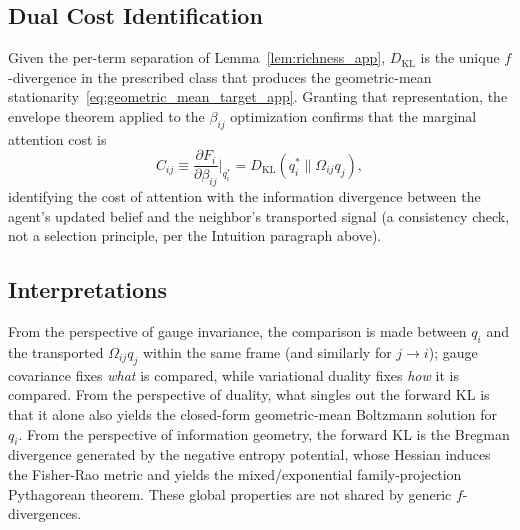 \documentclass[11pt]{article}
\begin{document}
\subsection*{Dual Cost Identification}
Given the per-term separation of Lemma~\ref{lem:richness_app}, $D_{\mathrm{KL}}$ is the unique $f$-divergence in the prescribed class that produces the geometric-mean stationarity~\eqref{eq:geometric_mean_target_app}. Granting that representation, the envelope theorem applied to the $\beta_{ij}$ optimization confirms that the marginal attention cost is
\begin{equation}
C_{ij} \equiv \frac{\partial F_i}{\partial\beta_{ij}}\bigg|_{q_i^*}
= D_{\mathrm{KL}}(q_i^*\|\Omega_{ij}q_j),
\end{equation}
identifying the cost of attention with the information divergence between the agent's updated belief and the neighbor's transported signal (a consistency check, not a selection principle, per the Intuition paragraph above).

\subsection*{Interpretations}
From the perspective of gauge invariance, the comparison is made between $q_i$ and the transported $\Omega_{ij}q_j$ within the same frame (and similarly for $j \rightarrow i$); gauge covariance fixes \emph{what} is compared, while variational duality fixes \emph{how} it is compared. From the perspective of duality, what singles out the forward KL is that it alone also yields the closed-form geometric-mean Boltzmann solution for $q_i$. From the perspective of information geometry, the forward KL is the Bregman divergence generated by the negative entropy potential, whose Hessian induces the Fisher-Rao metric and yields the mixed/exponential family-projection Pythagorean theorem. These global properties are not shared by generic $f$-divergences.
\end{document}
